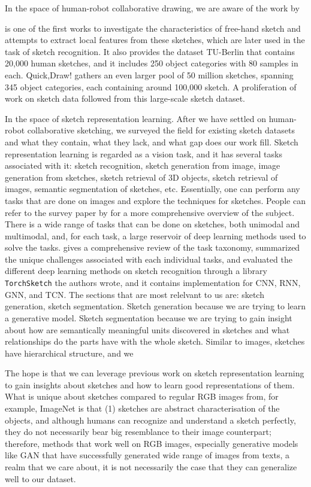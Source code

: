 In the space of human-robot collaborative drawing, we are aware of the work by 

\citet{eitz2012hdhso} is one of the first works to investigate the characteristics of free-hand sketch and attempts to extract local features from these sketches, which are later used in the task of sketch recognition. It also provides the dataset TU-Berlin that contains 20,000 human sketches, and it includes 250 object categories with 80 samples in each. Quick,Draw! gathers an even larger pool of 50 million sketches, spanning 345 object categories, each containing around 100,000 sketch. A proliferation of work on sketch data followed from this large-scale sketch dataset.

In the space of sketch representation learning. After we have settled on human-robot collaborative sketching, we surveyed the field for existing sketch datasets and what they contain, what they lack, and what gap does our work fill. Sketch representation learning is regarded as a vision task, and it has several tasks associated with it: sketch recognition, sketch generation from image, image generation from sketches, sketch retrieval of 3D objects, sketch retrieval of images, semantic segmentation of sketches, etc. Essentially, one can perform any tasks that are done on images and explore the techniques for sketches. People can refer to the survey paper by \citet{sketchsurvey} for a more comprehensive overview of the subject. There is a wide range of tasks that can be done on sketches, both unimodal and multimodal, and, for each task, a large reservoir of deep learning methods used to solve the tasks. \citet{sketchsurvey} gives a comprehensive review of the task taxonomy, summarized the unique challenges associated with each individual tasks, and evaluated the different deep learning methods on sketch recognition through a library \texttt{TorchSketch} the authors wrote, and it contains implementation for CNN, RNN, GNN, and TCN. The sections that are most relelvant to us are: sketch generation, sketch segmentation. Sketch generation because we are trying to learn a generative model. Sketch segmentation because we are trying to gain insight about how are semantically meaningful units discovered in sketches and what relationships do the parts have with the whole sketch.      
Similar to images, sketches have hierarchical structure, and we 

The hope is that we can leverage previous work on sketch representation learning to gain insights about sketches and how to learn good representations of them. What is unique about sketches compared to regular RGB images from, for example, ImageNet is that (1) sketches are abstract characterisation of the objects, and although humans can recognize and understand a sketch perfectly, they do not necessarily bear big resemblance to their image counterpart; therefore, methods that work well on RGB images, especially generative models like GAN that have successfully generated wide range of images from texts, a realm that we care about, it is not necessarily the case that they can generalize well to our dataset.  


